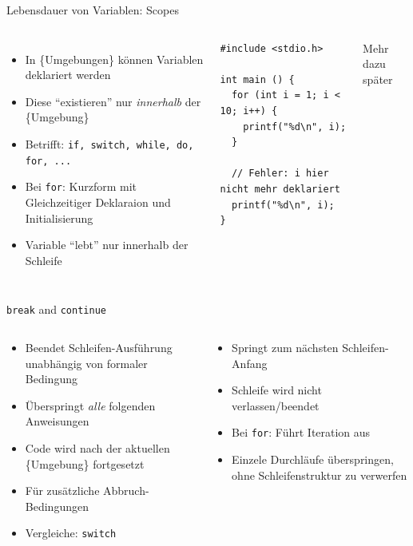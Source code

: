\begin{frame}[fragile]{Lebensdauer von Variablen: Scopes}
%
\begin{columns}[T]
\begin{itemize}
\item In \{Umgebungen\} können Variablen deklariert werden
\item Diese \enquote{existieren} nur \emph{innerhalb} der \{Umgebung\}
\item Betrifft: \texttt{if, switch, while, do, for, ...}
\item Bei \texttt{for}: Kurzform mit Gleichzeitiger Deklaraion und Initialisierung
\item Variable \enquote{lebt} nur innerhalb der Schleife
\end{itemize}
%
\begin{codebox}
\begin{verbatim}
#include <stdio.h>

int main () {
  for (int i = 1; i < 10; i++) {
    printf("%d\n", i);
  }
  
  // Fehler: i hier nicht mehr deklariert
  printf("%d\n", i);
}
\end{verbatim}
\end{codebox}
Mehr dazu später
\end{columns}
%
\end{frame}


\begin{frame}[fragile]{\texttt{break} and \texttt{continue}}
%
\begin{columns}[T]
\begin{tcolorbox}[title=\texttt{break}]
\begin{itemize}
\item Beendet Schleifen-Ausführung unabhängig von formaler Bedingung
\item Überspringt \emph{alle} folgenden Anweisungen
\item Code wird nach der aktuellen \{Umgebung\} fortgesetzt
\item Für zusätzliche Abbruch-Bedingungen
\item Vergleiche: \texttt{switch}
\end{itemize}
\end{tcolorbox}
%
\begin{tcolorbox}[title=\texttt{continue}]
\begin{itemize}
\item Springt zum nächsten Schleifen-Anfang
\item Schleife wird nicht verlassen/beendet
\item Bei \texttt{for}: Führt Iteration aus
\item Einzele Durchläufe überspringen, ohne Schleifenstruktur zu verwerfen
\end{itemize}
\end{tcolorbox}
\end{columns}
%
\end{frame}

